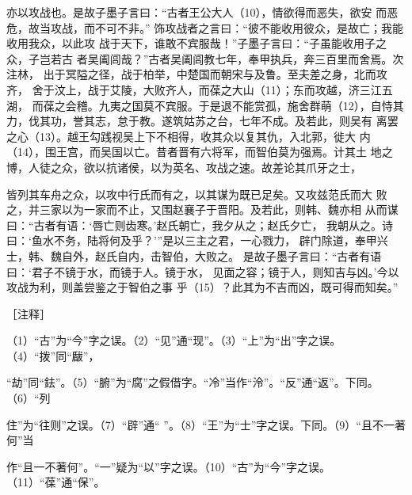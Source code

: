 \documentclass[12pt,UTF8]{ctexbook}
\begin{document}
亦以攻战也。是故子墨子言曰：“古者王公大人（10），情欲得而恶失，欲安 
而恶危，故当攻战，而不可不非。” 
饰攻战者之言曰：“彼不能收用彼众，是故亡；我能收用我众，以此攻 
战于天下，谁敢不宾服哉！”子墨子言曰：“子虽能收用子之众，子岂若古 
者吴阖闾哉？”古者吴阖闾教七年，奉甲执兵，奔三百里而舍焉。次注林， 
出于冥隘之径，战于柏举，中楚国而朝宋与及鲁。至夫差之身，北而攻齐， 
舍于汶上，战于艾陵，大败齐人，而葆之大山（11）；东而攻越，济三江五湖， 
而葆之会稽。九夷之国莫不宾服。于是退不能赏孤，施舍群萌（12），自恃其 
力，伐其功，誉其志，怠于教。遂筑姑苏之台，七年不成。及若此，则吴有 
离罢之心（13）。越王勾践视吴上下不相得，收其众以复其仇，入北郭，徙大 
内（14），围王宫，而吴国以亡。昔者晋有六将军，而智伯莫为强焉。计其土 
地之博，人徒之众，欲以抗诸侯，以为英名、攻战之速。故差论其爪牙之士， 

皆列其车舟之众，以攻中行氏而有之，以其谋为既已足矣。又攻兹范氏而大 
败之，并三家以为一家而不止，又围赵襄子于晋阳。及若此，则韩、魏亦相 
从而谋曰：“古者有语：‘唇亡则齿寒。’赵氏朝亡，我夕从之；赵氏夕亡， 
我朝从之。诗曰：‘鱼水不务，陆将何及乎？’”是以三主之君，一心戮力， 
辟门除道，奉甲兴士，韩、魏自外，赵氏自内，击智伯，大败之。 
是故子墨子言曰：“古者有语曰：‘君子不镜于水，而镜于人。镜于水， 
见面之容；镜于人，则知吉与凶。’今以攻战为利，则盖尝鉴之于智伯之事 
乎（15）？此其为不吉而凶，既可得而知矣。” 


［注释］ 

（1）“古”为“今”字之误。（2）“见”通“现”。（3）“上”为“出”字之误。（4）“拨”同“瞂”， 

“劫”同“鉣”。（5）“腑”为“腐”之假借字。“冷”当作“泠”。“反”通“返”。下同。（6）“列 

住”为“往则”之误。（7）“辟”通“ ”。（8）“王”为“士”字之误。下同。（9）“且不一著何”当 

作“且一不著何”。“一”疑为“以”字之误。（10）“古”为“今”字之误。（11）“葆”通“保”。 
\end{document}
